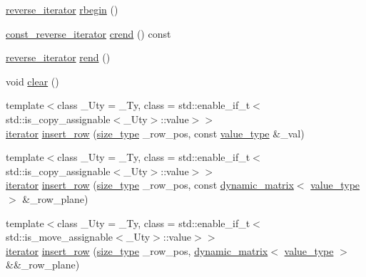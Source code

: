 \begin{DoxyCompactItemize}
\item 
\hyperlink{classcrsc_1_1dynamic__r3__tensor_acc9533d771b0b766874a6c984bc3a31a}{reverse\+\_\+iterator} \hyperlink{classcrsc_1_1dynamic__r3__tensor_a38f3de3f83d8dc94b3879b4df7fc929d}{rbegin} ()
\item 
\hyperlink{classcrsc_1_1dynamic__r3__tensor_afed2f011951ec314926ef9368aae848a}{const\+\_\+reverse\+\_\+iterator} \hyperlink{classcrsc_1_1dynamic__r3__tensor_a8f79b1f9fe2478be6fdcb7b458fee24c}{crend} () const 
\item 
\hyperlink{classcrsc_1_1dynamic__r3__tensor_acc9533d771b0b766874a6c984bc3a31a}{reverse\+\_\+iterator} \hyperlink{classcrsc_1_1dynamic__r3__tensor_a796f90326a82fae6c86ffe3f6ae18c84}{rend} ()
\item 
void \hyperlink{classcrsc_1_1dynamic__r3__tensor_a0b111a91d1dbbcc4dce77bb0f8b9d9d9}{clear} ()
\item 
{\footnotesize template$<$class \+\_\+\+Uty  = \+\_\+\+Ty, class  = std\+::enable\+\_\+if\+\_\+t$<$std\+::is\+\_\+copy\+\_\+assignable$<$\+\_\+\+Uty$>$\+::value$>$$>$ }\\\hyperlink{classcrsc_1_1dynamic__r3__tensor_a8da8f1c3ec1cde63d7693e41c9e7f496}{iterator} \hyperlink{classcrsc_1_1dynamic__r3__tensor_a1fa9b43ca2502cdd6814246c83a23d1a}{insert\+\_\+row} (\hyperlink{classcrsc_1_1dynamic__r3__tensor_a00e5f1f46f16d0c0ac1cffa6bd0fe862}{size\+\_\+type} \+\_\+row\+\_\+pos, const \hyperlink{classcrsc_1_1dynamic__r3__tensor_ad7fb44388c819fb7947771da18bb625b}{value\+\_\+type} \&\+\_\+val)
\item 
{\footnotesize template$<$class \+\_\+\+Uty  = \+\_\+\+Ty, class  = std\+::enable\+\_\+if\+\_\+t$<$std\+::is\+\_\+copy\+\_\+assignable$<$\+\_\+\+Uty$>$\+::value$>$$>$ }\\\hyperlink{classcrsc_1_1dynamic__r3__tensor_a8da8f1c3ec1cde63d7693e41c9e7f496}{iterator} \hyperlink{classcrsc_1_1dynamic__r3__tensor_a2d74d867394789623153aa9f72c91603}{insert\+\_\+row} (\hyperlink{classcrsc_1_1dynamic__r3__tensor_a00e5f1f46f16d0c0ac1cffa6bd0fe862}{size\+\_\+type} \+\_\+row\+\_\+pos, const \hyperlink{classcrsc_1_1dynamic__matrix}{dynamic\+\_\+matrix}$<$ \hyperlink{classcrsc_1_1dynamic__r3__tensor_ad7fb44388c819fb7947771da18bb625b}{value\+\_\+type} $>$ \&\+\_\+row\+\_\+plane)
\item 
{\footnotesize template$<$class \+\_\+\+Uty  = \+\_\+\+Ty, class  = std\+::enable\+\_\+if\+\_\+t$<$std\+::is\+\_\+move\+\_\+assignable$<$\+\_\+\+Uty$>$\+::value$>$$>$ }\\\hyperlink{classcrsc_1_1dynamic__r3__tensor_a8da8f1c3ec1cde63d7693e41c9e7f496}{iterator} \hyperlink{classcrsc_1_1dynamic__r3__tensor_a18665ab8d39b017ad749004f11c1cca3}{insert\+\_\+row} (\hyperlink{classcrsc_1_1dynamic__r3__tensor_a00e5f1f46f16d0c0ac1cffa6bd0fe862}{size\+\_\+type} \+\_\+row\+\_\+pos, \hyperlink{classcrsc_1_1dynamic__matrix}{dynamic\+\_\+matrix}$<$ \hyperlink{classcrsc_1_1dynamic__r3__tensor_ad7fb44388c819fb7947771da18bb625b}{value\+\_\+type} $>$ \&\&\+\_\+row\+\_\+plane)

\end{DoxyCompactItemize}
